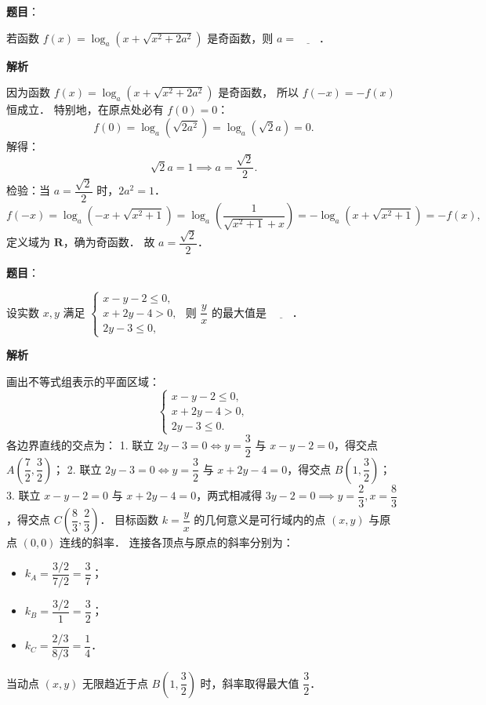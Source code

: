 \begin{answer}

\textbf{题目}：

若函数 $f(x) = \log_a(x + \sqrt{x^2 + 2a^2})$ 是奇函数，则 $a = \underline{\hspace{2em}}$．

\textbf{解析}

因为函数 $f(x) = \log_a(x + \sqrt{x^2 + 2a^2})$ 是奇函数，
所以 $f(-x) = -f(x)$ 恒成立．
特别地，在原点处必有 $f(0) = 0$：
\nopagebreak[4]
\[
f(0) = \log_a(\sqrt{2a^2}) = \log_a(\sqrt{2}a) = 0.
\]
解得：
\nopagebreak[4]
\[
\sqrt{2}a = 1 \implies a = \dfrac{\sqrt{2}}{2}.
\]
检验：当 $a = \dfrac{\sqrt{2}}{2}$ 时，$2a^2 = 1$．
\nopagebreak[4]
\[
f(-x) = \log_a(-x + \sqrt{x^2 + 1}) = \log_a\left(\dfrac{1}{\sqrt{x^2 + 1} + x}\right) = -\log_a(x + \sqrt{x^2 + 1}) = -f(x),
\]
定义域为 $\mathbf{R}$，确为奇函数．
故 $a = \dfrac{\sqrt{2}}{2}$．


\end{answer}
\begin{answer}

\textbf{题目}：

设实数 $x, y$ 满足 $\begin{cases} x - y - 2 \leqslant 0, \\ x + 2y - 4 > 0, \\ 2y - 3 \leqslant 0, \end{cases}$ 则 $\dfrac{y}{x}$ 的最大值是 $\underline{\hspace{2em}}$．

\textbf{解析}

画出不等式组表示的平面区域：
\nopagebreak[4]
\[
\begin{cases} x - y - 2 \leqslant 0, \\ x + 2y - 4 > 0, \\ 2y - 3 \leqslant 0. \end{cases}
\]
各边界直线的交点为：
1. 联立 $2y - 3 = 0 \iff y = \dfrac{3}{2}$ 与 $x - y - 2 = 0$，得交点 $A\left(\dfrac{7}{2}, \dfrac{3}{2}\right)$；
2. 联立 $2y - 3 = 0 \iff y = \dfrac{3}{2}$ 与 $x + 2y - 4 = 0$，得交点 $B\left(1, \dfrac{3}{2}\right)$；
3. 联立 $x - y - 2 = 0$ 与 $x + 2y - 4 = 0$，两式相减得 $3y - 2 = 0 \implies y = \dfrac{2}{3}, x = \dfrac{8}{3}$，得交点 $C\left(\dfrac{8}{3}, \dfrac{2}{3}\right)$．
目标函数 $k = \dfrac{y}{x}$ 的几何意义是可行域内的点 $(x, y)$ 与原点 $(0, 0)$ 连线的斜率．
连接各顶点与原点的斜率分别为：
\begin{itemize}
\item $k_A = \dfrac{3/2}{7/2} = \dfrac{3}{7}$；
\item $k_B = \dfrac{3/2}{1} = \dfrac{3}{2}$；
\item $k_C = \dfrac{2/3}{8/3} = \dfrac{1}{4}$．
\end{itemize}
当动点 $(x, y)$ 无限趋近于点 $B\left(1, \dfrac{3}{2}\right)$ 时，斜率取得最大值 $\dfrac{3}{2}$．


\end{answer}
